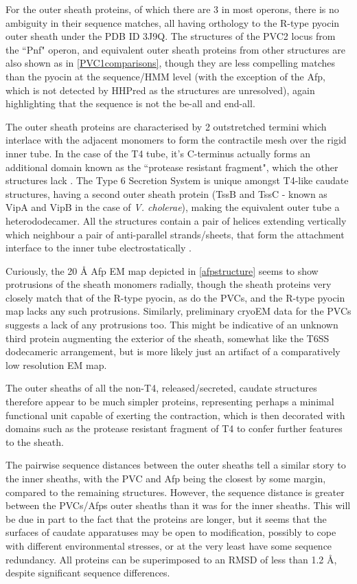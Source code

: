 For the outer sheath proteins, of which there are 3 in most operons, there is no ambiguity in their sequence matches, all having orthology to the R-type pyocin outer sheath under the PDB ID 3J9Q. The structures of the PVC2 locus from the ``Pnf" operon, and equivalent outer sheath proteins from other structures are also shown as in \vref{PVC1comparisons}, though they are less compelling matches than the pyocin at the sequence/HMM level (with the exception of the Afp, which is not detected by HHPred as the structures are unresolved), again highlighting that the sequence is not the be-all and end-all.

The outer sheath proteins are characterised by 2 outstretched termini which interlace with the adjacent monomers to form the contractile mesh over the rigid inner tube. In the case of the T4 tube, it's C-terminus actually forms an additional domain known as the ``protease resistant fragment", which the other structures lack \citep{Aksyuk2009}. The Type 6 Secretion System is unique amongst T4-like caudate structures, having a second outer sheath protein (TssB and TssC - known as VipA and VipB in the case of \emph{V. cholerae}), making the equivalent outer tube a heterododecamer. All the structures contain a pair of helices extending vertically which neighbour a pair of anti-parallel strands/sheets, that form the attachment interface to the inner tube electrostatically \citep{Ge2015}.

Curiously, the 20 \AA{} Afp EM map depicted in \vref{afpstructure} seems to show protrusions of the sheath monomers radially, though the sheath proteins very closely match that of the R-type pyocin, as do the PVCs, and the R-type pyocin map lacks any such protrusions. Similarly, preliminary cryoEM data for the PVCs suggests a lack of any protrusions too. This might be indicative of an unknown third protein augmenting the exterior of the sheath, somewhat like the T6SS dodecameric arrangement, but is more likely just an artifact of a comparatively low resolution EM map.

The outer sheaths of all the non-T4, released/secreted, caudate structures therefore appear to be much simpler proteins, representing perhaps a minimal functional unit capable of exerting the contraction, which is then decorated with domains such as the protease resistant fragment of T4 to confer further features to the sheath.

The pairwise sequence distances between the outer sheaths tell a similar story to the inner sheaths, with the PVC and Afp being the closest by some margin, compared to the remaining structures. However, the sequence distance is greater between the PVCs/Afps outer sheaths than it was for the inner sheaths. This will be due in part to the fact that the proteins are longer, but it seems that the surfaces of caudate apparatuses may be open to modification, possibly to cope with different environmental stresses, or at the very least have some sequence redundancy. All proteins can be superimposed to an RMSD of less than 1.2 \AA, despite significant sequence differences.


